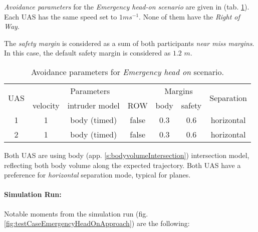 \noindent \emph{Avoidance parameters} for the \emph{Emergency head-on scenario} are given in (tab. \ref{tab:aboidanceParametersForEmergencyHeadOnScenario}). Each UAS has the same speed set to $1 m s^{-1}$. None of them have the \emph{Right of Way}. 

The \emph{safety margin} is considered as a sum of both participants \emph{near miss margins}. In this case, the default safety margin is considered as $1.2$ $m$.

\begin{table}[H]
    \centering
    \begin{tabular}{c||c|c|c||c|c||c}
        \multirow{2}{*}{UAS} & \multicolumn{3}{c||}{Parameters} & \multicolumn{2}{c||}{Margins} & \multirow{2}{*}{Separation}                                            \\\cline{2-6}
                             & velocity & intruder model & ROW        & body & safety \\\hline\hline
        1                    & 1        & body (timed)  & false            & 0.3         & 0.6           & horizontal\\\hline
        2                    & 1        & body (timed)  & false             & 0.3         & 0.6  & horizontal          \\
    \end{tabular}
    \caption{Avoidance parameters for  \emph{Emergency head on} scenario.}
    \label{tab:aboidanceParametersForEmergencyHeadOnScenario}
\end{table}


\begin{note}
Both UAS are using  body (app. \ref{s:bodyvolumeIntersection}) intersection model, reflecting both body volume along the expected  trajectory. Both UAS have a preference for \emph{horizontal} separation mode, typical for planes.
\end{note}

\paragraph{Simulation Run:} Notable moments from the simulation run (fig. \ref{fig:testCaseEmergencyHeadOnApproach}) are the following:


